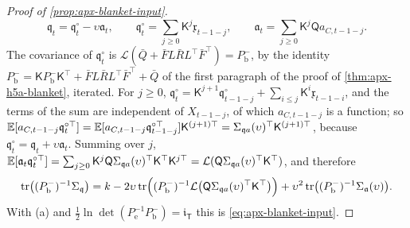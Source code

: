 \begin{proof}[Proof of \cref{prop:apx-blanket-input}]
\begin{equation*}
\mathfrak q_t=\mathfrak q^\circ_t-\upsilon\mathfrak a_t,\qquad\mathfrak q^\circ_t=\sum_{j\ge0}\mathsf K^j\mathfrak x_{t-1-j},\qquad\mathfrak a_t=\sum_{j\ge0}\mathsf K^j\mathsf Qa_{C,t-1-j} .
\end{equation*}
The covariance of $\mathfrak q^\circ_t$ is $\mathcal L(\bar Q+\bar FL\bar RL^\top\bar F^\top)=P^-_{\mathrm b}$, by the identity $P^-_{\mathrm b}=\mathsf KP^-_{\mathrm b}\mathsf K^\top+\bar FL\bar RL^\top\bar F^\top+\bar Q$ of the first paragraph of the proof of \cref{thm:apx-h5a-blanket}, iterated. For $j\ge0$, $\mathfrak q^\circ_t=\mathsf K^{j+1}\mathfrak q^\circ_{t-1-j}+\sum_{i\le j}\mathsf K^i\mathfrak x_{t-1-i}$, and the terms of the sum are independent of $X_{t-1-j}$, of which $a_{C,t-1-j}$ is a function; so $\mathbb{E}[a_{C,t-1-j}\mathfrak q^{\circ\top}_t]=\mathbb{E}[a_{C,t-1-j}\mathfrak q^{\circ\top}_{t-1-j}]\mathsf K^{(j+1)\top}=\Sigma_{\mathfrak qa}(\upsilon)^\top\mathsf K^{(j+1)\top}$, because $\mathfrak q^\circ_t=\mathfrak q_t+\upsilon\mathfrak a_t$. Summing over $j$, $\mathbb{E}[\mathfrak a_t\mathfrak q^{\circ\top}_t]=\sum_{j\ge0}\mathsf K^j\mathsf Q\Sigma_{\mathfrak qa}(\upsilon)^\top\mathsf K^\top\mathsf K^{j\top}=\mathcal L(\mathsf Q\Sigma_{\mathfrak qa}(\upsilon)^\top\mathsf K^\top)$, and therefore
\begin{equation*}
\operatorname{tr}\bigl((P^-_{\mathrm b})^{-1}\Sigma_{\mathfrak q}\bigr)=k-2\upsilon\operatorname{tr}\Bigl((P^-_{\mathrm b})^{-1}\mathcal L\bigl(\mathsf Q\Sigma_{\mathfrak qa}(\upsilon)^\top\mathsf K^\top\bigr)\Bigr)+\upsilon^2\operatorname{tr}\bigl((P^-_{\mathrm b})^{-1}\Sigma_{\mathfrak a}(\upsilon)\bigr) .
\end{equation*}
With (a) and $\frac12\ln\det(P_{\mathrm e}^{-1}P^-_{\mathrm b})=\mathfrak i_{\mathsf T}$ this is \eqref{eq:apx-blanket-input}.


\end{proof}
